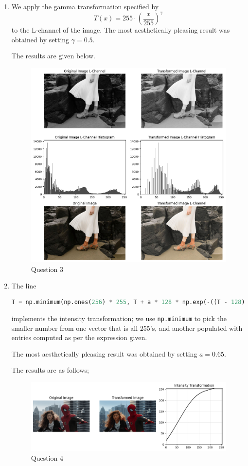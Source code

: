 \documentclass{article}[a4paper]
\begin{document}
\begin{enumerate}
	\item We apply the gamma transformation specified by \[
		T(x) = 255 \cdot \left(\dfrac{x}{255}\right) ^ \gamma
	\] to the L-channel of the image. The most aesthetically pleasing result was obtained by setting $\gamma = 0.5$.
	
	The results are given below.

	\begin{figure}[H]
		\centering
		\includegraphics[width=0.9\linewidth]{images/q3.png}
		\caption{Question 3}
	\end{figure}
	
	\item The line
	\begin{lstlisting}[language=Python]
T = np.minimum(np.ones(256) * 255, T + a * 128 * np.exp(-((T - 128) ** 2) / (2 * sigma ** 2)))
	\end{lstlisting}
	implements the intensity transformation; we use \lstinline|np.minimum| to pick the smaller number from one vector that is all $255$'s, and
	another populated with entries computed as per the expression given.
	
	The most aesthetically pleasing result was obtained by setting $a = 0.65$.
	
	The results are as follows;

	\begin{figure}[H]
		\centering
		\includegraphics[width=0.9\linewidth]{images/q4.png}
		\caption{Question 4}
	\end{figure}


\end{enumerate}
\end{document}
